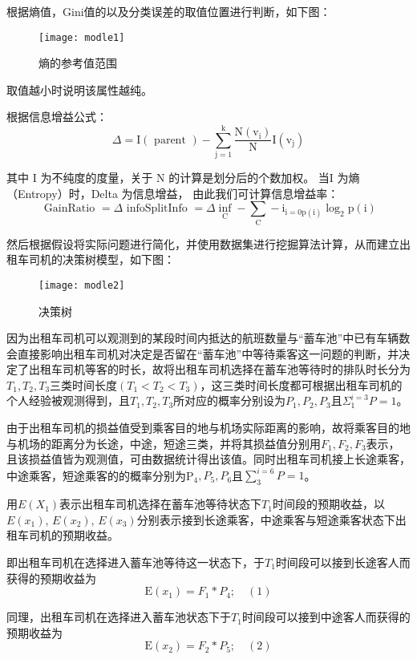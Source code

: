 \documentclass[withoutpreface,bwprint]{cumcmthesis} %
\begin{document}
根据熵值，Gini值的以及分类误差的取值位置进行判断，如下图：
\begin{figure}[!h]
	\centering
	\texttt{[image: modle1]}
	\caption{熵的参考值范围}
	\label{fig:circuit-diagram}
\end{figure}

取值越小时说明该属性越纯。

根据信息增益公式：
$$
\Delta=\mathrm{I}(\text { parent })-\sum_{\mathrm{j}=1}^{\mathrm{k}} \frac{\mathrm{N}\left(\mathrm{v}_{\mathrm{i}}\right)}{\mathrm{N}} \mathrm{I}\left(\mathrm{v}_{\mathrm{j}}\right)
$$

其中 I 为不纯度的度量，关于 N 的计算是划分后的个数加权。 
当I 为熵（Entropy）时，Delta 为信息增益，
由此我们可计算信息增益率：
$$
\text { GainRatio }=\Delta \text { infoSplitInfo }=\Delta \inf _{\mathrm{C}}-\sum_{\mathrm{C}}-\mathrm{i}_{\mathrm{i}=0 \mathrm{p}(\mathrm{i})} \log _{2} \mathrm{p}(\mathrm{i})
$$

然后根据假设将实际问题进行简化，并使用数据集进行挖掘算法计算，从而建立出租车司机的决策树模型，如下图：
\begin{figure}[!htbp]
	\centering
	\texttt{[image: modle2]}
	\caption{决策树}
	\label{fig:circuit-diagram}
\end{figure}

因为出租车司机可以观测到的某段时间内抵达的航班数量与“蓄车池”中已有车辆数会直接影响出租车司机对决定是否留在“蓄车池”中等待乘客这一问题的判断，并决定了出租车司机等客的时长，故将出租车司机选择在蓄车池等待时的排队时长分为$T_1,T_2,T_3$三类时间长度$\left(T_{1}<T_{2}<T_{3}\right)$，这三类时间长度都可根据出租车司机的个人经验被观测得到，且$T_1,T_2,T_3$所对应的概率分别设为$P_1,P_2,P_3$且$\Sigma_{1}^{i=3} P=1$。

由于出租车司机的损益值受到乘客目的地与机场实际距离的影响，故将乘客目的地与机场的距离分为长途，中途，短途三类，并将其损益值分别用$F_1,F_2,F_3$表示，且该损益值皆为观测值，可由数据统计得出该值。同时出租车司机接上长途乘客，中途乘客，短途乘客的的概率分别为P$_4,P_5,P_6$且$\sum_{3}^{i=6} P=1$。

用$E(X_1)$表示出租车司机选择在蓄车池等待状态下$T_1$时间段的预期收益，以$E(x_1)$, $E(x_2)$, $E(x_3)$分别表示接到长途乘客，中途乘客与短途乘客状态下出租车司机的预期收益。

即出租车司机在选择进入蓄车池等待这一状态下，于$T_1$时间段可以接到长途客人而获得的预期收益为
$$
\mathrm{E}\left(x_{1}\right)=F_{1} * P_{4} ; \quad(1)
$$

同理，出租车司机在选择进入蓄车池状态下于$T_1$时间段可以接到中途客人而获得的预期收益为
$$
\mathrm{E}\left(x_{2}\right)=F_{2} * P_{5} ; \quad(2)
$$
\end{document}
